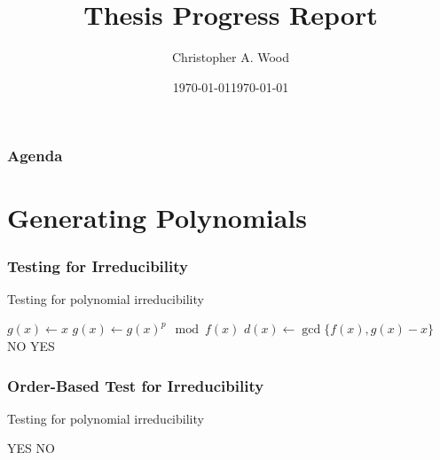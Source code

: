 \documentclass[handout]{beamer}
\title[Composite Field Decomposition for Higher Order S-boxes]{Thesis Progress Report}
\institute[RIT]{}
\date{\today}
\author{Christopher A. Wood}
\date{\today}
\begin{document}

\begin{frame}
	\titlepage
\end{frame}

\begin{frame}
	\frametitle{Agenda}
	\tableofcontents
\end{frame}


\section{Generating Polynomials}
\begin{frame}[fragile]
	\frametitle{Testing for Irreducibility}
\begin{algorithm}[H]  %
\caption{Testing for polynomial irreducibility} 
\begin{algorithmic}[1]
\State $g(x) \gets x$ 
	\State $g(x) \gets g(x)^p \mod f(x)$
	\State $d(x) \gets \gcd\{f(x), g(x) - x\}$
		\State NO
	\EndIf 
\EndFor
\Return YES
\end{algorithmic}
\end{algorithm}
\end{frame}

\begin{frame}[fragile]
	\frametitle{Order-Based Test for Irreducibility}
\begin{algorithm}[H] 
\caption{Testing for polynomial irreducibility} 
\begin{algorithmic}[1]
		\Return YES
	\EndIf
\EndFor
\Return NO
\end{algorithmic}
\end{algorithm}
\end{frame}
\end{document}
